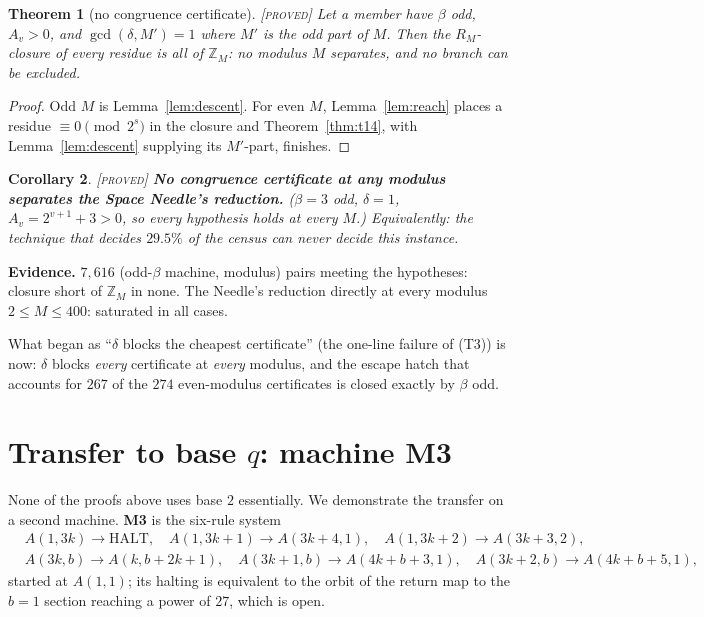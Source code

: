 \documentclass[11pt]{article}
\newtheorem{theorem}{Theorem}[section]
\newtheorem{corollary}[theorem]{Corollary}
\theoremstyle{definition}
\theoremstyle{remark}
\newenvironment{evidence}
  {\par\smallskip\noindent\footnotesize\textbf{Evidence.}}
  {\par\smallskip}
\newcommand{\Z}{\mathbb{Z}}
\newcommand{\Proved}{\textsc{[proved]}}
\begin{document}
\begin{theorem}[no congruence certificate]\label{thm:t15}
\Proved{}\; Let a member have $\beta$ odd, $A_v>0$, and $\gcd(\delta,M')=1$
where $M'$ is the odd part of $M$.  Then the $R_M$-closure of every residue is
all of $\Z_M$: no modulus $M$ separates, and no branch can be excluded.
\end{theorem}

\begin{proof}
Odd $M$ is Lemma~\ref{lem:descent}.  For even $M$, Lemma~\ref{lem:reach} places
a residue $\equiv0\pmod{2^{s}}$ in the closure and Theorem~\ref{thm:t14}, with
Lemma~\ref{lem:descent} supplying its $M'$-part, finishes.
\end{proof}

\begin{corollary}\label{cor:needle}
\Proved{}\; \textbf{No congruence certificate at any modulus separates the
Space Needle's reduction.}  ($\beta=3$ odd, $\delta=1$, $A_v=2^{v+1}+3>0$, so
every hypothesis holds at every $M$.)  Equivalently: the technique that decides
$29.5\%$ of the census can never decide this instance.
\end{corollary}

\begin{evidence}
$7{,}616$ (odd-$\beta$ machine, modulus) pairs meeting the hypotheses: closure
short of $\Z_M$ in none.  The Needle's reduction directly at every modulus
$2\le M\le400$: saturated in all cases.
\end{evidence}

What began as ``$\delta$ blocks the cheapest certificate'' (the one-line
failure of (T3)) is now: $\delta$ blocks \emph{every} certificate at
\emph{every} modulus, and the escape hatch that accounts for $267$ of the
$274$ even-modulus certificates is closed exactly by $\beta$ odd.

\section{Transfer to base $q$: machine M3}
\label{sec:baseq}

None of the proofs above uses base $2$ essentially.  We demonstrate the
transfer on a second machine.  \textbf{M3} is the six-rule system
\[
\begin{aligned}
&A(1,3k)\to\text{HALT},\quad A(1,3k{+}1)\to A(3k{+}4,1),\quad
A(1,3k{+}2)\to A(3k{+}3,2),\\
&A(3k,b)\to A(k,b{+}2k{+}1),\quad A(3k{+}1,b)\to A(4k{+}b{+}3,1),\quad
A(3k{+}2,b)\to A(4k{+}b{+}5,1),
\end{aligned}
\]
started at $A(1,1)$; its halting is equivalent to the orbit of the return map
to the $b=1$ section reaching a power of $27$, which is open.
\end{document}
